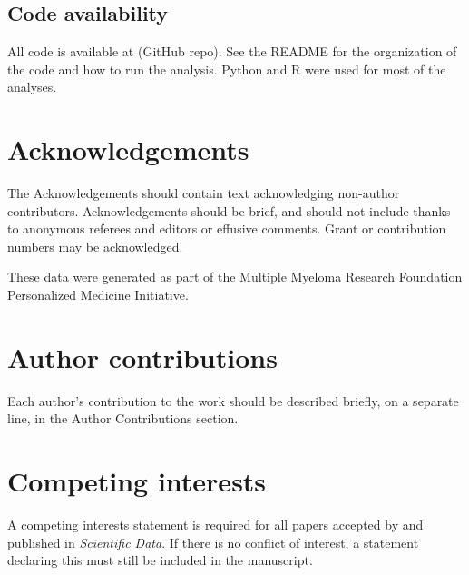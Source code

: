 \documentclass[english, 12pt, letterpaper]{article}
\begin{document}
\subsection*{Code availability}

All code is available at (GitHub repo).
See the README for the organization of the code and how to run the analysis.
Python \cite{van1995python} and R \cite{Rlang} were used for most of the analyses.



\section*{Acknowledgements}

The Acknowledgements should contain text acknowledging non-author contributors.
Acknowledgements should be brief, and should not include thanks to anonymous referees and editors or effusive comments.
Grant or contribution numbers may be acknowledged.

These data were generated as part of the Multiple Myeloma Research Foundation Personalized Medicine Initiative.

\section*{Author contributions}

Each author’s contribution to the work should be described briefly, on a separate line, in the Author Contributions section. 

\section*{Competing interests}

A competing interests statement is required for all papers accepted by and published in \emph{Scientific Data}. If there is no conflict of interest, a statement declaring this must still be included in the manuscript.


{}

\end{document}
